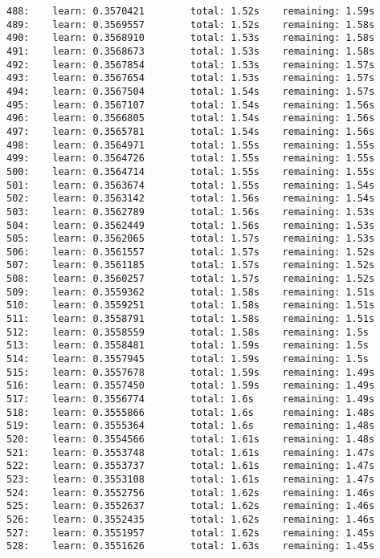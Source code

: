 \documentclass[11pt]{article}
\begin{document}
\begin{Verbatim}[commandchars=\\\{\}]
488:    learn: 0.3570421        total: 1.52s    remaining: 1.59s
489:    learn: 0.3569557        total: 1.52s    remaining: 1.58s
490:    learn: 0.3568910        total: 1.53s    remaining: 1.58s
491:    learn: 0.3568673        total: 1.53s    remaining: 1.58s
492:    learn: 0.3567854        total: 1.53s    remaining: 1.57s
493:    learn: 0.3567654        total: 1.53s    remaining: 1.57s
494:    learn: 0.3567504        total: 1.54s    remaining: 1.57s
495:    learn: 0.3567107        total: 1.54s    remaining: 1.56s
496:    learn: 0.3566805        total: 1.54s    remaining: 1.56s
497:    learn: 0.3565781        total: 1.54s    remaining: 1.56s
498:    learn: 0.3564971        total: 1.55s    remaining: 1.55s
499:    learn: 0.3564726        total: 1.55s    remaining: 1.55s
500:    learn: 0.3564714        total: 1.55s    remaining: 1.55s
501:    learn: 0.3563674        total: 1.55s    remaining: 1.54s
502:    learn: 0.3563142        total: 1.56s    remaining: 1.54s
503:    learn: 0.3562789        total: 1.56s    remaining: 1.53s
504:    learn: 0.3562449        total: 1.56s    remaining: 1.53s
505:    learn: 0.3562065        total: 1.57s    remaining: 1.53s
506:    learn: 0.3561557        total: 1.57s    remaining: 1.52s
507:    learn: 0.3561185        total: 1.57s    remaining: 1.52s
508:    learn: 0.3560257        total: 1.57s    remaining: 1.52s
509:    learn: 0.3559362        total: 1.58s    remaining: 1.51s
510:    learn: 0.3559251        total: 1.58s    remaining: 1.51s
511:    learn: 0.3558791        total: 1.58s    remaining: 1.51s
512:    learn: 0.3558559        total: 1.58s    remaining: 1.5s
513:    learn: 0.3558481        total: 1.59s    remaining: 1.5s
514:    learn: 0.3557945        total: 1.59s    remaining: 1.5s
515:    learn: 0.3557678        total: 1.59s    remaining: 1.49s
516:    learn: 0.3557450        total: 1.59s    remaining: 1.49s
517:    learn: 0.3556774        total: 1.6s     remaining: 1.49s
518:    learn: 0.3555866        total: 1.6s     remaining: 1.48s
519:    learn: 0.3555364        total: 1.6s     remaining: 1.48s
520:    learn: 0.3554566        total: 1.61s    remaining: 1.48s
521:    learn: 0.3553748        total: 1.61s    remaining: 1.47s
522:    learn: 0.3553737        total: 1.61s    remaining: 1.47s
523:    learn: 0.3553108        total: 1.61s    remaining: 1.47s
524:    learn: 0.3552756        total: 1.62s    remaining: 1.46s
525:    learn: 0.3552637        total: 1.62s    remaining: 1.46s
526:    learn: 0.3552435        total: 1.62s    remaining: 1.46s
527:    learn: 0.3551957        total: 1.62s    remaining: 1.45s
528:    learn: 0.3551626        total: 1.63s    remaining: 1.45s

\end{Verbatim}
\end{document}
